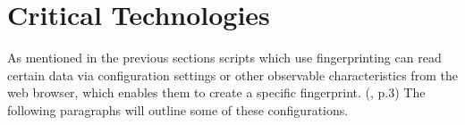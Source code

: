 \section{Critical Technologies}

As mentioned in the previous sections scripts which use fingerprinting can read certain data via configuration settings or other observable characteristics from the web browser, which enables them to create a specific fingerprint. (\textcite{doty18}, p.3) The following paragraphs will outline some of these configurations. 

